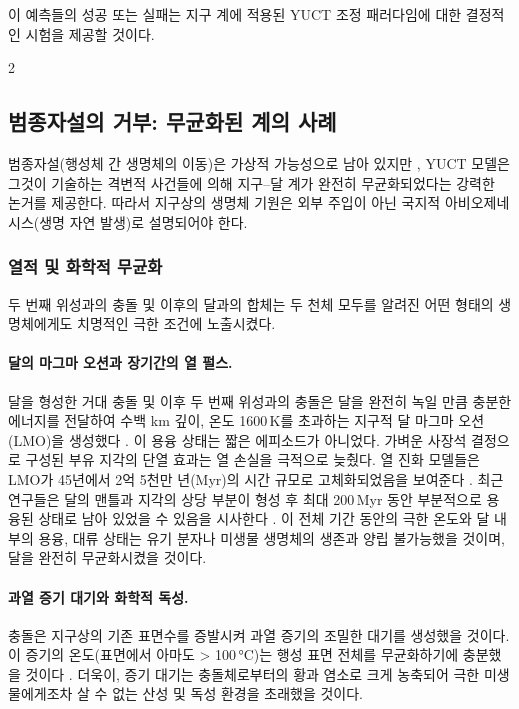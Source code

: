 \documentclass[12pt,a4paper]{article}
\begin{document}
	이 예측들의 성공 또는 실패는 지구 계에 적용된 YUCT 조정 패러다임에 대한 결정적인 시험을 제공할 것이다.
	
	\begin{multicols}{2}
		
		\subsection{범종자설의 거부: 무균화된 계의 사례}
		범종자설(행성체 간 생명체의 이동)은 가상적 가능성으로 남아 있지만 \cite{PanspermiaReview}, YUCT 모델은 그것이 기술하는 격변적 사건들에 의해 지구–달 계가 완전히 무균화되었다는 강력한 논거를 제공한다. 따라서 지구상의 생명체 기원은 외부 주입이 아닌 국지적 아비오제네시스(생명 자연 발생)로 설명되어야 한다.
		
		\subsubsection{열적 및 화학적 무균화}
		두 번째 위성과의 충돌 및 이후의 달과의 합체는 두 천체 모두를 알려진 어떤 형태의 생명체에게도 치명적인 극한 조건에 노출시켰다.
		
		\paragraph{달의 마그마 오션과 장기간의 열 펄스.}
		달을 형성한 거대 충돌 및 이후 두 번째 위성과의 충돌은 달을 완전히 녹일 만큼 충분한 에너지를 전달하여 수백 km 깊이, 온도 1600 K를 초과하는 지구적 달 마그마 오션(LMO)을 생성했다 \cite{Sahijpal2020}. 이 용융 상태는 짧은 에피소드가 아니었다. 가벼운 사장석 결정으로 구성된 부유 지각의 단열 효과는 열 손실을 극적으로 늦췄다. 열 진화 모델들은 LMO가 45년에서 2억 5천만 년(Myr)의 시간 규모로 고체화되었음을 보여준다 \cite{Colin2024, Maurice2018}. 최근 연구들은 달의 맨틀과 지각의 상당 부분이 형성 후 최대 200 Myr 동안 부분적으로 용융된 상태로 남아 있었을 수 있음을 시사한다 \cite{Maurice2020}. 이 전체 기간 동안의 극한 온도와 달 내부의 용융, 대류 상태는 유기 분자나 미생물 생명체의 생존과 양립 불가능했을 것이며, 달을 완전히 무균화시켰을 것이다.
		
		\paragraph{과열 증기 대기와 화학적 독성.}
		충돌은 지구상의 기존 표면수를 증발시켜 과열 증기의 조밀한 대기를 생성했을 것이다. 이 증기의 온도(표면에서 아마도 > 100 °C)는 행성 표면 전체를 무균화하기에 충분했을 것이다 \cite{Zahnle2015}. 더욱이, 증기 대기는 충돌체로부터의 황과 염소로 크게 농축되어 극한 미생물에게조차 살 수 없는 산성 및 독성 환경을 초래했을 것이다.
		

\end{multicols}
\end{document}
